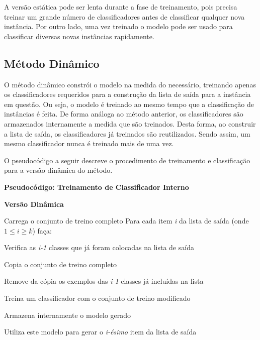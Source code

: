 A versão estática pode ser lenta durante a fase de treinamento, pois precisa treinar um grande número de classificadores antes de classificar qualquer nova instância. Por outro lado, uma vez treinado o modelo pode ser usado para classificar diversas novas instâncias rapidamente.

\subsection{Método Dinâmico}

O método dinâmico constrói o modelo na medida do necessário, treinando apenas os classificadores requeridos para a construção da lista de saída para a instância em questão. Ou seja, o modelo é treinado ao mesmo tempo que a classificação de instâncias é feita. De forma análoga ao método anterior, os classificadores são armazenados internamente a medida que são treinados. Desta forma, ao construir a lista de saída, os classificadores já treinados são reutilizados. Sendo assim, um mesmo classificador nunca é treinado mais de uma vez. 

O pseudocódigo a seguir descreve o procedimento de treinamento e classificação para a versão dinâmica do método.
\\

\hline
\begin{center}
\textbf{Pseudocódigo: Treinamento de Classificador Interno}

\textbf{Versão Dinâmica}
\end{center}
\hline
\hfill \break
Carrega o conjunto de treino completo\newline
Para cada item \textit{i} da lista de saída (onde $1 \leq i \geq k$) faça:

\quad Verifica as \textit{i-1} classes que já foram colocadas na lista de saída

\quad Copia o conjunto de treino completo

\quad Remove da cópia os exemplos das \textit{i-1} classes já incluídas na lista

\quad Treina um classificador com o conjunto de treino modificado

\quad Armazena internamente o modelo gerado

\quad Utiliza este modelo para gerar o \textit{i-ésimo} item da lista de saída
\hline
\hfill \break

